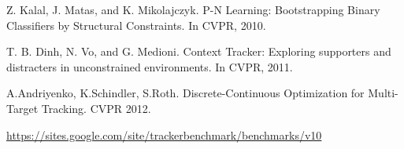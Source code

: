 \documentclass{acm_proc_article-sp}
\begin{document}
\begin{thebibliography}{99}
Z. Kalal, J. Matas, and K. Mikolajczyk. P-N Learning: Bootstrapping Binary Classifiers by Structural Constraints. In CVPR, 2010.

T. B. Dinh, N. Vo, and G. Medioni. Context Tracker: Exploring supporters and distracters in unconstrained environments. In CVPR, 2011.

A.Andriyenko, K.Schindler, S.Roth. Discrete-Continuous Optimization for Multi-Target Tracking. CVPR 2012.


\url{https://sites.google.com/site/trackerbenchmark/benchmarks/v10}

\end{thebibliography}
\end{document}
